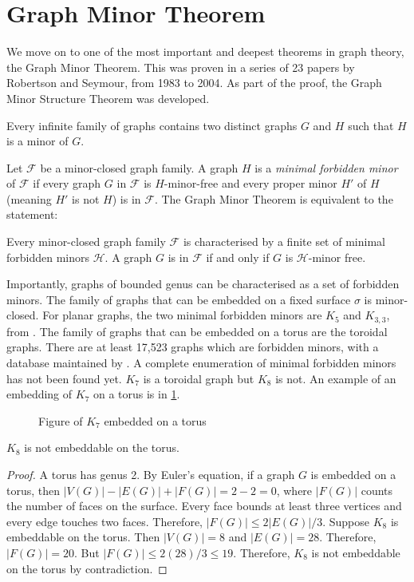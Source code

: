 \section{Graph Minor Theorem}\label{sec:Graph Minor Theorem}
We move on to one of the most important and deepest theorems in graph theory, the Graph Minor Theorem. This was proven in a series of 23 papers by Robertson and Seymour, from 1983 to 2004. As part of the proof, the Graph Minor Structure Theorem was developed. 
\begin{theorem}
	Every infinite family of graphs contains two distinct graphs \(G\) and \(H\) such that \(H\) is a minor of \(G\).
\end{theorem}
Let $\mathcal{F}$ be a minor-closed graph family. A graph $H$ is a \textit{minimal forbidden minor} of $\mathcal{F}$ if every graph $G$ in $\mathcal{F}$ is $H$-minor-free and every proper minor $H'$ of $H$ (meaning $H'$ is not $H$) is in $\mathcal{F}$. 
The Graph Minor Theorem is equivalent to the statement:
\begin{theorem}
	Every minor-closed graph family $\mathcal{F}$ is characterised by a finite set of minimal forbidden minors $\mathcal{H}$. A graph $G$ is in $\mathcal{F}$ if and only if $G$ is $\mathcal{H}$-minor free.
\end{theorem}
Importantly, graphs of bounded genus can be characterised as a set of forbidden minors. The family of graphs that can be embedded on a fixed surface $\sigma$ is minor-closed. 
For planar graphs, the two minimal forbidden minors are \(K_5\) and \(K_{3,3}\), from \textcite{wagnerUeberEigenschaftEbenen1937}. 
The family of graphs that can be embedded on a torus are the toroidal graphs. There are at least 17,523 graphs which are forbidden minors, with a database maintained by \textcite{myrvoldLargeSetTorus2018}. A complete enumeration of minimal forbidden minors has not been found yet. $K_7$ is a toroidal graph but $K_8$ is not. An example of an embedding of $K_7$ on a torus is in \cref{fig:k7_on_torus}.

\begin{figure}[h!]
	\centering
	
	\caption{Figure of $K_7$ embedded on a torus}\label{fig:k7_on_torus}
\end{figure}

\begin{lemma}
	$K_8$ is not embeddable on the torus.
\end{lemma}
\begin{proof}
	A torus has genus 2. By Euler's equation, if a graph $G$ is embedded on a torus, then $|V(G)| - |E(G)| + |F(G)| = 2 - 2 = 0$, where $|F(G)|$ counts the number of faces on the surface. Every face bounds at least three vertices and every edge touches two faces. Therefore, $|F(G)| \leq 2|E(G)|/3$. Suppose $K_8$ is embeddable on the torus. Then $|V(G)| = 8$ and $|E(G)| = 28$. Therefore, $|F(G)| = 20$. But $|F(G)| \leq 2 (28)/3 \leq 19$. Therefore, $K_8$ is not embeddable on the torus by contradiction.
\end{proof}

